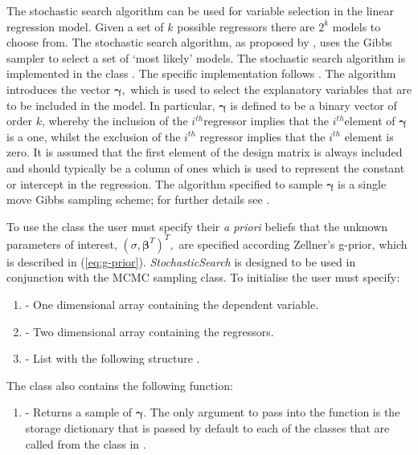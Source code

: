 \documentclass[article]{jss}
\begin{document}
The stochastic search algorithm can be used for variable selection in
the linear regression model. Given a set of $k$ possible regressors
there are $2^{k}$ models to choose from. The stochastic search
algorithm, as proposed by \citet{GeorgeMcCulloch1993}, uses the Gibbs
sampler to select a set of `most likely' models. The stochastic search
algorithm is implemented in the class . The
specific implementation follows \citet{MarinRobert2007}. The algorithm
introduces the vector $\bm{\gamma},$ which is used to select the
explanatory variables that are to be included in the model. In
particular, $\bm{\gamma}$ is defined to be a binary vector of order
$k$, whereby the inclusion of the $i^{th}$regressor implies that the
$i^{th}$element of $\bm{\gamma}$ is a one, whilst the exclusion of the
$i^{th}$ regressor implies that the $i^{th}$ element is zero.  It is
assumed that the first element of the design matrix is always included
and should typically be a column of ones which is used to represent
the constant or intercept in the regression. The algorithm specified
to sample $\bm{\gamma}$ is a single move Gibbs sampling scheme; for
further details see \citet{MarinRobert2007}.

To use the class the user must specify their
\emph{a priori} beliefs that the unknown parameters of interest,
$(\sigma,\bm{\beta}^{T})^{T},$ are specified according Zellner's
g-prior, which is described in (\ref{eq:g-prior}).
\emph{StochasticSearch }is designed to be used in conjunction with the
MCMC sampling class. To initialise  the user
must specify:
\begin{enumerate}
\item {} - One dimensional  array containing the
  dependent variable.
\item {} - Two dimensional  array containing the
  regressors.
\item {} - List with the following structure
  \code{{[}betaubar, g{]}}.
\end{enumerate}
The class  also contains the following
function:
\begin{enumerate}
\item {} - Returns a sample of $\bm{\gamma}.$
  The only argument to pass into the function  is
  the storage dictionary that is passed by default to each of the
  classes that are called from the class in .
\end{enumerate}
\end{document}
